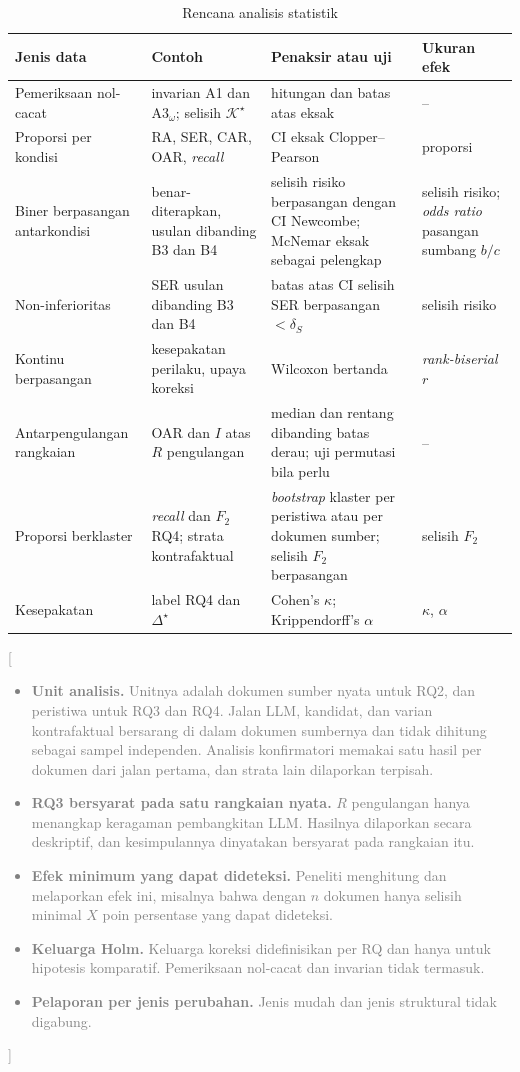 \documentclass[journal,a4paper]{IEEEtran}
\newcommand{\en}[1]{\textit{#1}}
\newcommand{\K}{\mathcal{K}}
\newcommand{\emas}{\star}
\newif\ifrancangan \rancangantrue
\newcommand{\isian}[1]{\ifrancangan\textcolor{gray}{[#1]}\fi}
\begin{document}
\begin{table}[t]
\centering
\caption{Rencana analisis statistik}
\label{tab:statistik}
\scriptsize
\begin{tabularx}{\textwidth}{@{}P{3.3cm} P{3.4cm} L P{2.7cm}@{}}
\toprule
\textbf{Jenis data} & \textbf{Contoh} & \textbf{Penaksir atau uji} & \textbf{Ukuran efek} \\
\midrule
Pemeriksaan nol-cacat & invarian A1 dan A3$_\omega$; selisih $\K^{\emas}$ & hitungan dan batas atas eksak & -- \\
Proporsi per kondisi & RA, SER, CAR, OAR, \en{recall} & CI eksak Clopper--Pearson & proporsi \\
Biner berpasangan antarkondisi & benar-diterapkan, usulan dibanding B3 dan B4 & selisih risiko berpasangan dengan CI Newcombe; McNemar eksak sebagai pelengkap & selisih risiko; \en{odds ratio} pasangan sumbang $b/c$ \\
Non-inferioritas & SER usulan dibanding B3 dan B4 & batas atas CI selisih SER berpasangan $< \delta_S$ & selisih risiko \\
Kontinu berpasangan & kesepakatan perilaku, upaya koreksi & Wilcoxon bertanda & \en{rank-biserial} $r$ \\
Antarpengulangan rangkaian & OAR dan $I$ atas $R$ pengulangan & median dan rentang dibanding batas derau; uji permutasi bila perlu & -- \\
Proporsi berklaster & \en{recall} dan $F_2$ RQ4; strata kontrafaktual & \en{bootstrap} klaster per peristiwa atau per dokumen sumber; selisih $F_2$ berpasangan & selisih $F_2$ \\
Kesepakatan & label RQ4 dan $\Delta^{\emas}$ & Cohen's $\kappa$; Krippendorff's $\alpha$ & $\kappa$, $\alpha$ \\
\bottomrule
\end{tabularx}
\end{table}

\isian{
\begin{itemize}[leftmargin=*,nosep]
  \item \textbf{Unit analisis.} Unitnya adalah dokumen sumber nyata untuk RQ2, dan peristiwa untuk RQ3 dan RQ4. Jalan LLM, kandidat, dan varian kontrafaktual bersarang di dalam dokumen sumbernya dan tidak dihitung sebagai sampel independen. Analisis konfirmatori memakai satu hasil per dokumen dari jalan pertama, dan strata lain dilaporkan terpisah.
  \item \textbf{RQ3 bersyarat pada satu rangkaian nyata.} $R$ pengulangan hanya menangkap keragaman pembangkitan LLM. Hasilnya dilaporkan secara deskriptif, dan kesimpulannya dinyatakan bersyarat pada rangkaian itu.
  \item \textbf{Efek minimum yang dapat dideteksi.} Peneliti menghitung dan melaporkan efek ini, misalnya bahwa dengan $n$ dokumen hanya selisih minimal $X$ poin persentase yang dapat dideteksi.
  \item \textbf{Keluarga Holm.} Keluarga koreksi didefinisikan per RQ dan hanya untuk hipotesis komparatif. Pemeriksaan nol-cacat dan invarian tidak termasuk.
  \item \textbf{Pelaporan per jenis perubahan.} Jenis mudah dan jenis struktural tidak digabung.
\end{itemize}}
\end{document}
